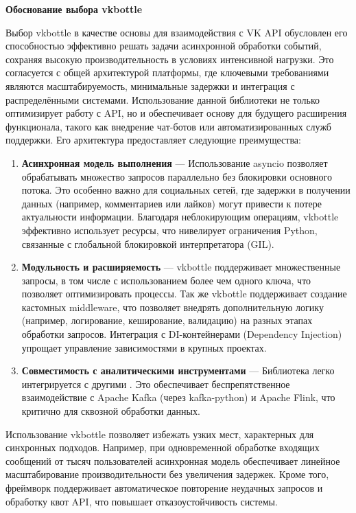             \textbf{Обоснование выбора vkbottle}

            Выбор vkbottle в качестве основы для взаимодействия с VK API обусловлен его способностью эффективно решать задачи асинхронной обработки событий, сохраняя высокую производительность в условиях интенсивной нагрузки. Это согласуется с общей архитектурой платформы, где ключевыми требованиями являются масштабируемость, минимальные задержки и интеграция с распределёнными системами. Использование данной библиотеки не только оптимизирует работу с API, но и обеспечивает основу для будущего расширения функционала, такого как внедрение чат-ботов или автоматизированных служб поддержки. Его архитектура предоставляет следующие преимущества:
            \begin{enumerate}
                \item \textbf{Асинхронная модель выполнения} — Использование asyncio позволяет обрабатывать множество запросов параллельно без блокировки основного потока. Это особенно важно для социальных сетей, где задержки в получении данных (например, комментариев или лайков) могут привести к потере актуальности информации. Благодаря неблокирующим операциям, vkbottle эффективно использует ресурсы, что нивелирует ограничения Python, связанные с глобальной блокировкой интерпретатора (GIL).
                \item \textbf{Модульность и расширяемость} — vkbottle поддерживает множественные запросы, в том числе с использованием более чем одного ключа, что позволяет оптимизировать процессы. Так же vkbottle поддерживает создание кастомных middleware, что позволяет внедрять дополнительную логику (например, логирование, кеширование, валидацию) на разных этапах обработки запросов. Интеграция с DI-контейнерами (Dependency Injection) упрощает управление зависимостями в крупных проектах.
                \item \textbf{Совместимость с аналитическими инструментами} — Библиотека легко интегрируется с другими . Это обеспечивает беспрепятственное взаимодействие с Apache Kafka (через kafka-python) и Apache Flink, что критично для сквозной обработки данных.
            \end{enumerate}

            Использование vkbottle позволяет избежать узких мест, характерных для синхронных подходов. Например, при одновременной обработке входящих сообщений от тысяч пользователей асинхронная модель обеспечивает линейное масштабирование производительности без увеличения задержек. Кроме того, фреймворк поддерживает автоматическое повторение неудачных запросов и обработку квот API, что повышает отказоустойчивость системы.
            
